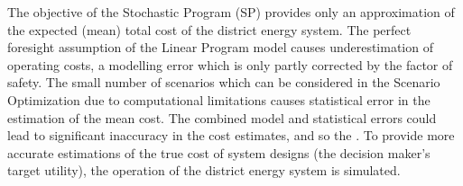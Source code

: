 
The objective of the Stochastic Program (SP) provides only an approximation of the expected (mean) total cost of the district energy system. The perfect foresight assumption of the Linear Program model causes underestimation of operating costs, a modelling error which is only partly corrected by the factor of safety. The small number of scenarios which can be considered in the Scenario Optimization due to computational limitations causes statistical error in the estimation of the mean cost.
The combined model and statistical errors could lead to significant inaccuracy in the cost estimates\footnotemark, and so the . To provide more accurate estimations of the true cost of system designs (the decision maker's target utility), the operation of the district energy system is simulated.


